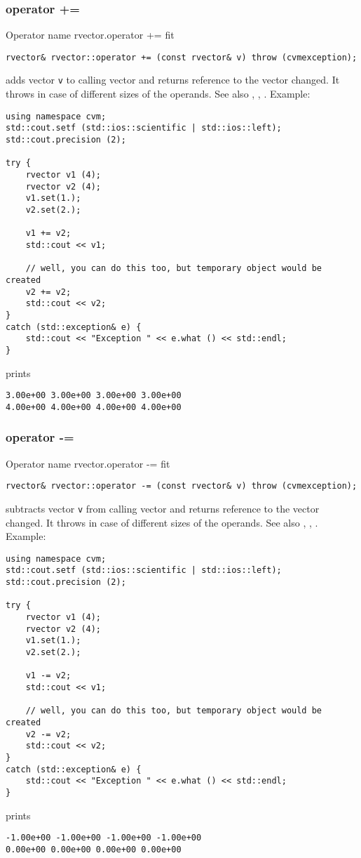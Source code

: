 \subsubsection{operator +=}
Operator%
\pdfdest name {rvector.operator +=} fit
\begin{verbatim}
rvector& rvector::operator += (const rvector& v) throw (cvmexception);
\end{verbatim}
adds vector \verb"v" to  calling vector 
and returns  reference to
the vector changed.
It throws  
in case of different sizes of the operands.
See also ,
,
.
Example:
\begin{Verbatim}
using namespace cvm;
std::cout.setf (std::ios::scientific | std::ios::left); 
std::cout.precision (2);

try {
    rvector v1 (4);
    rvector v2 (4);
    v1.set(1.);
    v2.set(2.);

    v1 += v2;
    std::cout << v1;

    // well, you can do this too, but temporary object would be created
    v2 += v2; 
    std::cout << v2;
}
catch (std::exception& e) {
    std::cout << "Exception " << e.what () << std::endl;
}
\end{Verbatim}
prints
\begin{Verbatim}
3.00e+00 3.00e+00 3.00e+00 3.00e+00
4.00e+00 4.00e+00 4.00e+00 4.00e+00
\end{Verbatim}
\newpage


\subsubsection{operator -=}
Operator%
\pdfdest name {rvector.operator -=} fit
\begin{verbatim}
rvector& rvector::operator -= (const rvector& v) throw (cvmexception);
\end{verbatim}
subtracts vector \verb"v" from calling vector 
and returns  reference to
the vector changed.
It throws  
in case of different sizes of the operands.
See also ,
,
.
Example:
\begin{Verbatim}
using namespace cvm;
std::cout.setf (std::ios::scientific | std::ios::left); 
std::cout.precision (2);

try {
    rvector v1 (4);
    rvector v2 (4);
    v1.set(1.);
    v2.set(2.);

    v1 -= v2;
    std::cout << v1;

    // well, you can do this too, but temporary object would be created
    v2 -= v2; 
    std::cout << v2;
}
catch (std::exception& e) {
    std::cout << "Exception " << e.what () << std::endl;
}
\end{Verbatim}
prints
\begin{Verbatim}
-1.00e+00 -1.00e+00 -1.00e+00 -1.00e+00
0.00e+00 0.00e+00 0.00e+00 0.00e+00
\end{Verbatim}
\newpage


